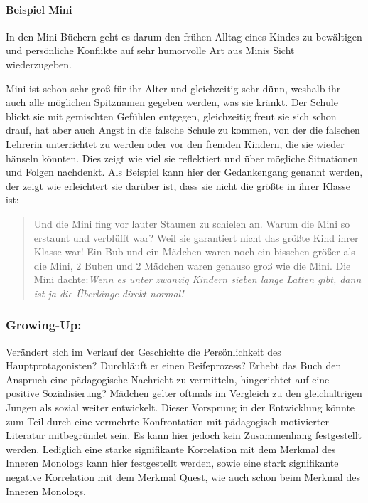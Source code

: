 \paragraph{Beispiel Mini}

In den Mini-Büchern geht es darum den frühen Alltag eines Kindes zu
bewältigen und persönliche Konflikte auf sehr humorvolle Art aus Minis
Sicht wiederzugeben.

Mini ist schon sehr groß für ihr Alter und gleichzeitig sehr dünn,
weshalb ihr auch alle möglichen Spitznamen gegeben werden, was sie
kränkt. Der Schule blickt sie mit gemischten Gefühlen entgegen,
gleichzeitig freut sie sich schon drauf, hat aber auch Angst in die
falsche Schule zu kommen, von der die falschen Lehrerin unterrichtet zu
werden oder vor den fremden Kindern, die sie wieder hänseln könnten.
Dies zeigt wie viel sie reflektiert und über mögliche Situationen und
Folgen nachdenkt. Als Beispiel kann hier der Gedankengang genannt
werden, der zeigt wie erleichtert sie darüber ist, dass sie nicht die
größte in ihrer Klasse ist:

\begin{quote}
Und die Mini fing vor lauter Staunen zu schielen an. \textelp{} Warum
die Mini so erstaunt und verblüfft war? Weil sie garantiert nicht das
größte Kind ihrer Klasse war! Ein Bub und ein Mädchen waren noch ein
bisschen größer als die Mini, 2 Buben und 2 Mädchen waren genauso groß
wie die Mini. Die Mini
dachte:\emph{Wenn es unter zwanzig Kindern sieben \emph{lange Latten} gibt, dann ist ja die Überlänge direkt normal!}\parencite[][61]{Noestlinger2011}
\end{quote}

\subsubsection{Growing-Up:}

Verändert sich im Verlauf der Geschichte die Persönlichkeit des
Hauptprotagonisten? Durchläuft er einen Reifeprozess? Erhebt das Buch
den Anspruch eine pädagogische Nachricht zu vermitteln, hingerichtet auf
eine positive Sozialisierung? Mädchen gelter oftmals im Vergleich zu den
gleichaltrigen Jungen als sozial weiter entwickelt. Dieser Vorsprung in
der Entwicklung könnte zum Teil durch eine vermehrte Konfrontation mit
pädagogisch motivierter Literatur mitbegründet sein. Es kann hier jedoch
kein Zusammenhang festgestellt werden. Lediglich eine starke
signifikante Korrelation mit dem Merkmal des Inneren Monologs kann hier
festgestellt werden, sowie eine stark signifikante negative Korrelation
mit dem Merkmal Quest, wie auch schon beim Merkmal des Inneren Monologs.

